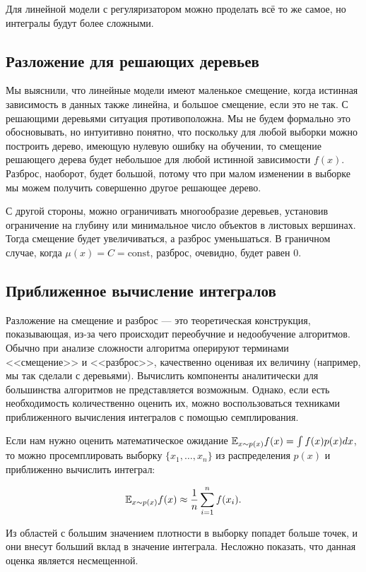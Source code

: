 \documentclass[12pt,fleqn]{article}
\begin{document}
Для линейной модели с регуляризатором можно проделать всё то же самое, но интегралы будут более сложными. 

\subsection{Разложение для решающих деревьев}

Мы выяснили, что линейные модели имеют маленькое смещение, когда истинная зависимость в данных также линейна, и большое смещение, если это не так.
С решающими деревьями ситуация противоположна.
Мы не будем формально это обосновывать, но интуитивно понятно, что поскольку для любой выборки можно построить дерево, имеющую нулевую ошибку на обучении, то смещение решающего дерева будет небольшое для любой истинной зависимости $f(x)$.
Разброс, наоборот, будет большой, потому что при малом изменении в выборке мы можем получить совершенно другое решающее дерево.

С другой стороны, можно ограничивать многообразие деревьев, установив ограничение на глубину или минимальное число объектов в листовых вершинах.
Тогда смещение будет увеличиваться, а разброс уменьшаться.
В граничном случае, когда $\mu(x) = C = \text{const}$, разброс, очевидно, будет равен 0.
    
\subsection{Приближенное вычисление интегралов}
Разложение на смещение и разброс --- это теоретическая конструкция, показывающая, из-за чего происходит переобучние и недообучение алгоритмов.
Обычно при анализе сложности алгоритма оперируют терминами <<смещение>> и <<разброс>>, качественно оценивая их величину (например, мы так сделали с деревьями).
Вычислить компоненты аналитически для большинства алгоритмов не представляется возможным.
Однако, если есть необходимость количественно оценить их, можно воспользоваться техниками приближенного вычисления интегралов с помощью семплирования.

Если нам нужно оценить математическое ожидание $\mathbb{E}_{x \sim p(x)} f(x) = \int f(x) p(x) dx$, то можно просемплировать выборку $\{x_1, \dots, x_n\}$ из распределения $p(x)$  и приближенно вычислить интеграл:

$$
\mathbb{E}_{x \sim p(x)} f(x) \approx \dfrac 1 n \sum_{i=1}^n f(x_i).
$$

Из областей с большим значением плотности в выборку попадет больше точек, и они внесут больший вклад в значение интеграла.
Несложно показать, что данная оценка является несмещенной.
\end{document}
